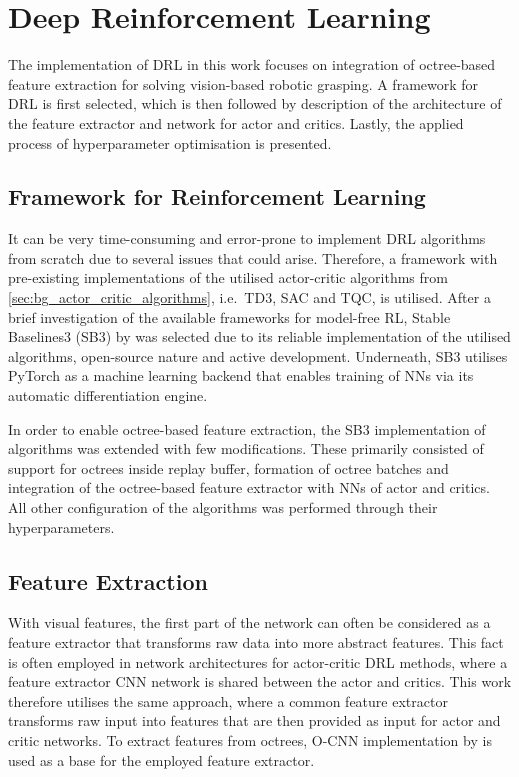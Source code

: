 \section{Deep Reinforcement Learning}

The implementation of DRL in this work focuses on integration of octree-based feature extraction for solving vision-based robotic grasping. A framework for DRL is first selected, which is then followed by description of the architecture of the feature extractor and network for actor and critics. Lastly, the applied process of hyperparameter optimisation is presented.


\subsection{Framework for Reinforcement Learning}

It can be very time-consuming and error-prone to implement DRL algorithms from scratch due to several issues that could arise. Therefore, a framework with pre-existing implementations of the utilised actor-critic algorithms from \autoref{sec:bg_actor_critic_algorithms}, i.e.~TD3, SAC and TQC, is utilised. After a brief investigation of the available frameworks for model-free RL, Stable Baselines3 (SB3) by \citet{raffin_stable-baselines3_2019} was selected due to its reliable implementation of the utilised algorithms, open-source nature and active development. Underneath, SB3 utilises PyTorch \cite{paszke_pytorch_2019} as a machine learning backend that enables training of NNs via its automatic differentiation engine.

In order to enable octree-based feature extraction, the SB3 implementation of algorithms was extended with few modifications. These primarily consisted of support for octrees inside replay buffer, formation of octree batches and integration of the octree-based feature extractor with NNs of actor and critics. All other configuration of the algorithms was performed through their hyperparameters.


\subsection{Feature Extraction}

With visual features, the first part of the network can often be considered as a feature extractor that transforms raw data into more abstract features. This fact is often employed in network architectures for actor-critic DRL methods, where a feature extractor CNN network is shared between the actor and critics. This work therefore utilises the same approach, where a common feature extractor transforms raw input into features that are then provided as input for actor and critic networks. To extract features from octrees, O-CNN implementation by \cite{wang_o-cnn_2017} is used as a base for the employed feature extractor.


